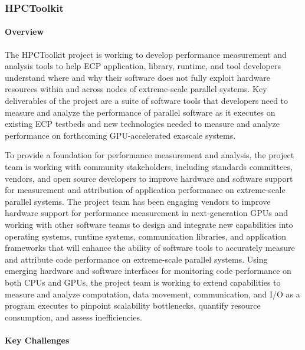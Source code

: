 
\subsubsection{ HPCToolkit} 
\paragraph{Overview} 

The HPCToolkit project is working to develop performance measurement
and analysis tools to help ECP application, library, runtime, and tool
developers understand where and why their software does not fully
exploit hardware resources within and across nodes of extreme-scale
parallel systems. Key deliverables of the project are a suite of
software tools that developers need to measure and analyze the
performance of parallel software as it executes on existing ECP
testbeds and new technologies needed to measure and analyze
performance on forthcoming GPU-accelerated exascale systems.

To provide a foundation for performance measurement and analysis, the
project team is working with community stakeholders, including
standards committees, vendors, and open source developers to improve
hardware and software support for measurement and attribution of
application performance on extreme-scale parallel systems. The
project team has been engaging vendors to improve hardware support
for performance measurement in next-generation GPUs and working
with other software teams to design and integrate new capabilities
into operating systems, runtime systems, communication libraries, and
application frameworks that will enhance the ability of software
tools to accurately measure and attribute code performance on
extreme-scale parallel systems.  Using emerging hardware and software
interfaces for monitoring code performance on both CPUs and GPUs, the project team is
working to extend capabilities to measure and analyze computation, data movement,
communication, and I/O as a program executes to pinpoint scalability
bottlenecks, quantify resource consumption, and assess
inefficiencies.

\paragraph{Key  Challenges}


